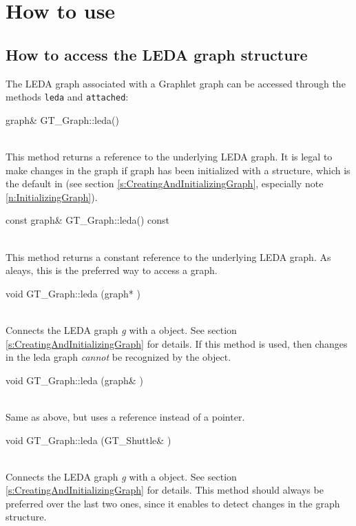 \documentclass[twoside,fleqn]{report}
\begin{document}
%
%

\section{How to use }
\label{s:UsingGTGRaph}

\subsection{How to access the LEDA graph structure}

The LEDA graph associated with a Graphlet graph can be accessed
through the methods \texttt{leda} and \texttt{attached}:

\begin{Cdefinition}

  \item[graph\& GT\_Graph::leda()] \strut\\
  This method returns a reference to the underlying LEDA graph.  It is 
  legal to make changes in the graph if graph has been initialized 
  with a  structure, which is the default in \Graphlet{} 
  (see section \ref{s:CreatingAndInitializingGraph}, especially 
  note \ref{n:InitializingGraph}).
  
  \item[const graph\& GT\_Graph::leda() const] \strut\\
  This method returns a constant reference to the underlying LEDA
  graph. As aleays, this is the preferred way to access a graph.

  \item[void GT\_Graph::leda (graph* \Param{g})] \strut\\
  Connects the LEDA graph \emph{g} with a  object. See
  section \ref{s:CreatingAndInitializingGraph} for details.
  If this method is used, then changes in the leda graph
  \emph{cannot} be recognized by the  object.
  
  \item[void GT\_Graph::leda (graph\& \Param{g})] \strut\\
  Same as above, but uses  a reference instead of a pointer.
  
  \item[void GT\_Graph::leda (GT\_Shuttle\& \Param{g})] \strut\\
  Connects the LEDA graph \emph{g} with a  object.
  See section \ref{s:CreatingAndInitializingGraph} for
  details. This method should always be preferred over the last
  two ones, since it enables  to detect changes in the
  graph structure.
  
\end{Cdefinition}
\end{document}
